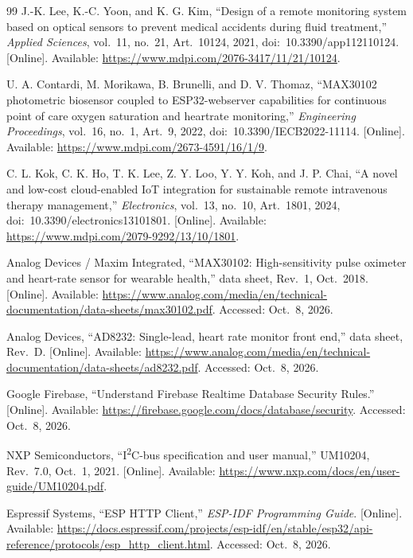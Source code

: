 \begin{thebibliography}{99}
J.-K. Lee, K.-C. Yoon, and K. G. Kim, ``Design of a remote monitoring system based on optical sensors to prevent medical accidents during fluid treatment,'' \emph{Applied Sciences}, vol.~11, no.~21, Art.~10124, 2021, doi:~10.3390/app112110124. [Online]. Available: \url{https://www.mdpi.com/2076-3417/11/21/10124}.

U. A. Contardi, M. Morikawa, B. Brunelli, and D. V. Thomaz, ``MAX30102 photometric biosensor coupled to ESP32-webserver capabilities for continuous point of care oxygen saturation and heartrate monitoring,'' \emph{Engineering Proceedings}, vol.~16, no.~1, Art.~9, 2022, doi:~10.3390/IECB2022-11114. [Online]. Available: \url{https://www.mdpi.com/2673-4591/16/1/9}.

C. L. Kok, C. K. Ho, T. K. Lee, Z. Y. Loo, Y. Y. Koh, and J. P. Chai, ``A novel and low-cost cloud-enabled IoT integration for sustainable remote intravenous therapy management,'' \emph{Electronics}, vol.~13, no.~10, Art.~1801, 2024, doi:~10.3390/electronics13101801. [Online]. Available: \url{https://www.mdpi.com/2079-9292/13/10/1801}.

Analog Devices / Maxim Integrated, ``MAX30102: High-sensitivity pulse oximeter and heart-rate sensor for wearable health,'' data sheet, Rev.~1, Oct.~2018. [Online]. Available: \url{https://www.analog.com/media/en/technical-documentation/data-sheets/max30102.pdf}. Accessed: Oct.~8, 2026.

Analog Devices, ``AD8232: Single-lead, heart rate monitor front end,'' data sheet, Rev.~D. [Online]. Available: \url{https://www.analog.com/media/en/technical-documentation/data-sheets/ad8232.pdf}. Accessed: Oct.~8, 2026.

Google Firebase, ``Understand Firebase Realtime Database Security Rules.'' [Online]. Available: \url{https://firebase.google.com/docs/database/security}. Accessed: Oct.~8, 2026.

NXP Semiconductors, ``I\textsuperscript{2}C-bus specification and user manual,'' UM10204, Rev.~7.0, Oct.~1, 2021. [Online]. Available: \url{https://www.nxp.com/docs/en/user-guide/UM10204.pdf}.

Espressif Systems, ``ESP HTTP Client,'' \emph{ESP-IDF Programming Guide}. [Online]. Available: \url{https://docs.espressif.com/projects/esp-idf/en/stable/esp32/api-reference/protocols/esp_http_client.html}. Accessed: Oct.~8, 2026.


\end{thebibliography}
